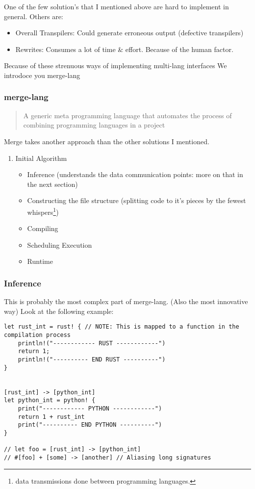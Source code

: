 \documentclass[9pt,twocolumn]{article}
\begin{document}
One of the few solution's that I mentioned above are hard to implement in general. Others are:

\begin{itemize}
\item Overall Transpilers: Could generate erroneous output (defective transpilers)
\item Rewrites: Consumes a lot of time \& effort. Because of the human factor.
\end{itemize}

Because of these strenuous ways of implementing multi-lang interfaces We introdoce you merge-lang
\subsubsection{merge-lang}
\label{sec:orge984264}
\begin{quote}
A generic meta programming language that automates the process of combining programming languages in a project
\end{quote}

Merge takes another approach than the other solutions I mentioned.
\begin{enumerate}
\item Initial Algorithm
\label{sec:org4af1c66}
\begin{itemize}
\item Inference (understands the data communication points: more on that in the next section)
\item Constructing the file structure (splitting code to it's pieces by the fewest whispers\footnote{data transmissions done between programming languages.})
\item Compiling
\item Scheduling Execution
\item Runtime
\end{itemize}
\end{enumerate}
\subsubsection{Inference}
\label{sec:orgc3d87a0}
This is probably the most complex part of merge-lang. (Also the most innovative way)
Look at the following example:

\begin{verbatim}
let rust_int = rust! { // NOTE: This is mapped to a function in the compilation process
    println!("------------ RUST ------------")
    return 1;
    println!("---------- END RUST ----------")
}


[rust_int] -> [python_int]
let python_int = python! {
    print("------------ PYTHON ------------")
    return 1 + rust_int
    print("---------- END PYTHON ----------")
}

// let foo = [rust_int] -> [python_int]
// #[foo] + [some] -> [another] // Aliasing long signatures
\end{verbatim}
\end{document}
